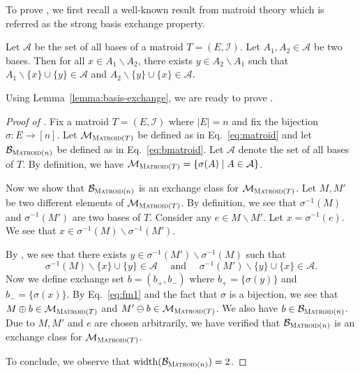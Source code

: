 \documentclass{article}
\newcommand{\M}{\mathcal M}
\newcommand{\B}{\mathcal B}
\newcommand{\del}{\backslash}
\DeclareMathOperator{\rank}{width}
\newcommand{\Matroid}{\textsc{Matroid}\xspace}
\begin{document}
To prove , we first recall a well-known result from matroid theory which is referred as the strong basis exchange property.
\begin{lemma}
\label{lemma:basis-exchange}
Let $\mathcal A$ be the set of all bases of a matroid $T=(E,\mathcal I)$. 
Let $A_1,A_2 \in \mathcal A$ be two bases.
Then for all $x \in A_1\del A_2$, there exists $y\in A_2\del A_1$ 
such that $A_1\del \{x\} \cup \{y\} \in \mathcal A$ and $A_2\del\{y\}\cup\{x\} \in \mathcal A$.
\end{lemma}
Using Lemma~\ref{lemma:basis-exchange}, we are ready to prove .
\begin{proof}[Proof of ]
Fix a matroid $T=(E,\mathcal I)$ where $|E|=n$ and fix the bijection $\sigma\colon E\rightarrow [n]$.
Let $\M_{\Matroid(T)}$ be defined as in Eq.~\eqref{eq:matroid} and let $\B_{\Matroid(n)}$ be defined as in Eq.~\eqref{eq:bmatroid}.
Let $\mathcal A$ denote the set of all bases of $T$. 
By definition, we have $\M_{\Matroid(T)} = \{\sigma(A) \mid A\in\mathcal A\}$.

Now we show that $\B_{\Matroid(n)}$ is an exchange class for $\M_{\Matroid(T)}$.
Let $M,M'$ be two different elements of $\M_{\Matroid(T)}$. 
By definition, we see that $\sigma^{-1}(M)$ and $\sigma^{-1}(M')$ are two bases of $T$.
Consider any $e\in M\del M'$. Let $x = \sigma^{-1}(e)$. 
We see that $x\in \sigma^{-1}(M) \del \sigma^{-1}(M')$. 

By , we see that there exists $y \in \sigma^{-1}(M') \del \sigma^{-1}(M)$ 
such that 
\begin{equation}
\label{eq:fm1}
\sigma^{-1}(M) \del \{x\} \cup \{y\} \in \mathcal A\quad\text{ and }\quad\sigma^{-1}(M') \del \{y\} \cup \{x\} \in \mathcal A.
\end{equation}
Now we define exchange set $b=(b_+,b_-)$ where $b_+ = \{\sigma(y)\}$ and $b_-=\{\sigma(x)\}$. 
By Eq.~\eqref{eq:fm1} and the fact that $\sigma$ is a bijection, we see that $M\oplus b \in \M_{\Matroid(T)}$ and $M'\ominus b \in \M_{\Matroid(T)}$. We also have $b\in \B_{\Matroid(n)}$.
Due to $M,M'$ and $e$ are chosen arbitrarily, we have verified that $\B_{\Matroid(n)}$ is an exchange class for $\M_{\Matroid(T)}$.

To conclude, we observe that $\rank(\B_{\Matroid(n)}) = 2$.
\end{proof}
\end{document}
